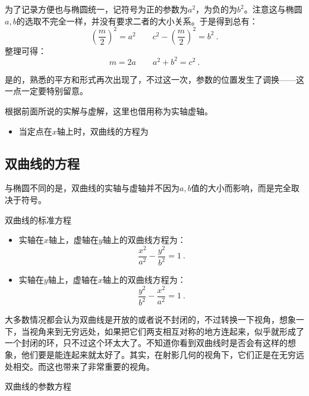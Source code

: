 为了记录方便也与椭圆统一，记符号为正的参数为$a^2$，为负的为$b^2$。注意这与椭圆$a,b$的选取不完全一样，并没有要求二者的大小关系。于是得到总有：
\begin{equation}
\left(\displaystyle\frac{m}{2}\right)^2=a^2\qquad c^2-\displaystyle\left(\frac{m}{2}\right)^2=b^2~.
\end{equation}
整理可得：
\begin{equation}
m=2a\qquad a^2+b^2=c^2~.
\end{equation}

是的，熟悉的平方和形式再次出现了，不过这一次，参数的位置发生了调换——这一点一定要特别留意。

根据前面所说的实解与虚解，这里也借用称为实轴虚轴。
\begin{itemize}
\item 当定点在$x$轴上时，双曲线的方程为
\end{itemize}


\subsection{双曲线的方程}

与椭圆不同的是，双曲线的实轴与虚轴并不因为$a,b$值的大小而影响，而是完全取决于符号。
\begin{theorem}{双曲线的标准方程}
\begin{itemize}
\item 实轴在$x$轴上，虚轴在$y$轴上的双曲线方程为：
\begin{equation}\label{eq_Hypb3_4}
\frac{x^2}{a^2} - \frac{y^2}{b^2} = 1~.
\end{equation}
\item 实轴在$y$轴上，虚轴在$x$轴上的双曲线方程为：
\begin{equation}
\frac{y^2}{b^2} -\frac{x^2}{a^2}  = 1~.
\end{equation}
\end{itemize}
\end{theorem}



大多数情况都会认为双曲线是开放的或者说不封闭的，不过转换一下视角，想象一下，当视角来到无穷远处，如果把它们两支相互对称的地方连起来，似乎就形成了一个封闭的环，只不过这个环太大了。不知道你看到双曲线时是否会有这样的想象，他们要是能连起来就太好了。其实，在射影几何的视角下，它们正是在无穷远处相交。而这也带来了非常重要的视角。

\begin{theorem}{双曲线的参数方程}

\end{theorem}

